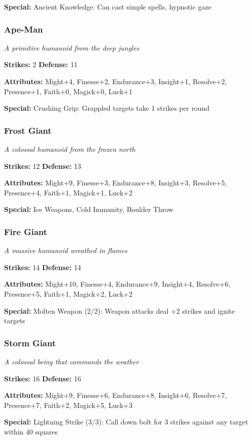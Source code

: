 \documentclass[10pt,twoside]{article}
\begin{document}
\textbf{Special:} Ancient Knowledge: Can cast simple spells, hypnotic gaze

\subsubsection{Ape-Man}
\textit{A primitive humanoid from the deep jungles}

\textbf{Strikes:} 2 \quad \textbf{Defense:} 11

\textbf{Attributes:} Might+4, Finesse+2, Endurance+3, Insight+1, Resolve+2, Presence+1, Faith+0, Magick+0, Luck+1

\textbf{Special:} Crushing Grip: Grappled targets take 1 strikes per round

\subsubsection{Frost Giant}
\textit{A colossal humanoid from the frozen north}

\textbf{Strikes:} 12 \quad \textbf{Defense:} 13

\textbf{Attributes:} Might+9, Finesse+3, Endurance+8, Insight+3, Resolve+5, Presence+4, Faith+1, Magick+1, Luck+2

\textbf{Special:} Ice Weapons, Cold Immunity, Boulder Throw

\subsubsection{Fire Giant}
\textit{A massive humanoid wreathed in flames}

\textbf{Strikes:} 14 \quad \textbf{Defense:} 14

\textbf{Attributes:} Might+10, Finesse+4, Endurance+9, Insight+4, Resolve+6, Presence+5, Faith+1, Magick+2, Luck+2

\textbf{Special:} Molten Weapon (2/2): Weapon attacks deal +2 strikes and ignite targets

\subsubsection{Storm Giant}
\textit{A colossal being that commands the weather}

\textbf{Strikes:} 16 \quad \textbf{Defense:} 16

\textbf{Attributes:} Might+9, Finesse+6, Endurance+8, Insight+6, Resolve+7, Presence+7, Faith+2, Magick+5, Luck+3

\textbf{Special:} Lightning Strike (3/3): Call down bolt for 3 strikes against any target within 40 squares
\end{document}
